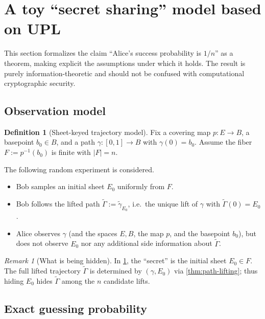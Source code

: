 \documentclass[11pt,a4paper]{article}
\theoremstyle{definition}
\newtheorem{definition}[theorem]{Definition}
\theoremstyle{remark}
\newtheorem{remark}[theorem]{Remark}
\begin{document}
\section{A toy ``secret sharing'' model based on UPL}
\label{sec:secret-model}

This section formalizes the claim ``Alice's success probability is \(1/n\)'' as a theorem, making explicit the assumptions under which it holds. The result is purely information-theoretic and should not be confused with computational cryptographic security.

\subsection{Observation model}
\label{sec:observation-model}

\begin{definition}[Sheet-keyed trajectory model]
\label{def:sheet-keyed-model}
Fix a covering map \(p:E\to B\), a basepoint \(b_0\in B\), and a path \(\gamma:[0,1]\to B\) with \(\gamma(0)=b_0\). Assume the fiber \(F:=p^{-1}(b_0)\) is finite with \(|F|=n\).

The following random experiment is considered.
\begin{itemize}
  \item Bob samples an initial sheet \(E_0\) uniformly from \(F\).
  \item Bob follows the lifted path \(\tilde\Gamma := \tilde\gamma_{E_0}\), i.e.\ the unique lift of \(\gamma\) with \(\tilde\Gamma(0)=E_0\).
  \item Alice observes \(\gamma\) (and the spaces \(E,B\), the map \(p\), and the basepoint \(b_0\)), but does not observe \(E_0\) nor any additional side information about \(\tilde\Gamma\).
\end{itemize}
\end{definition}

\begin{remark}[What is being hidden]
\label{rem:hidden-variable}
In \cref{def:sheet-keyed-model}, the ``secret'' is the initial sheet \(E_0\in F\). The full lifted trajectory \(\tilde\Gamma\) is determined by \((\gamma,E_0)\) via \cref{thm:path-lifting}; thus hiding \(E_0\) hides \(\tilde\Gamma\) among the \(n\) candidate lifts.
\end{remark}

\subsection{Exact guessing probability}
\label{sec:guessing-prob}
\end{document}
